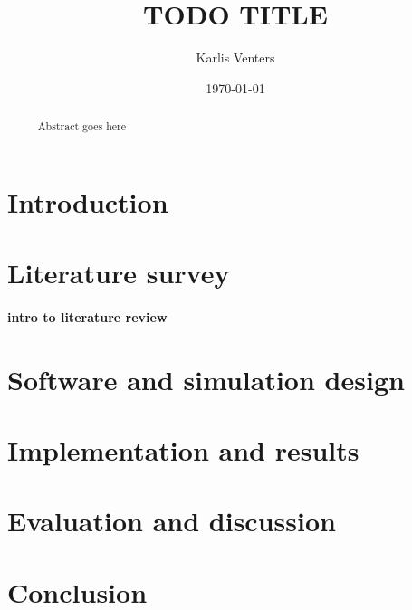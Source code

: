 \documentclass{csfourzero}
\title{TODO TITLE}
\author{Karlis Venters}
\date{\today}
\begin{document}
\maketitle

\begin{abstract}~
Abstract goes here
\end{abstract}

\newpage
\section{Introduction}
\label{sec:intro}
% 

\newpage
\section{Literature survey}
\label{sec:literature}
\paragraph{intro to literature review}



\newpage
\section{Software and simulation design}
\label{sec:software}


\newpage
\section{Implementation and results}
\label{sec:results}
% 

\newpage
\section{Evaluation and discussion}
\label{sec:evaluation}
% 

\newpage
\section{Conclusion}
\label{sec:conclusion}
% 

\newpage
\printbibliography
\end{document}
